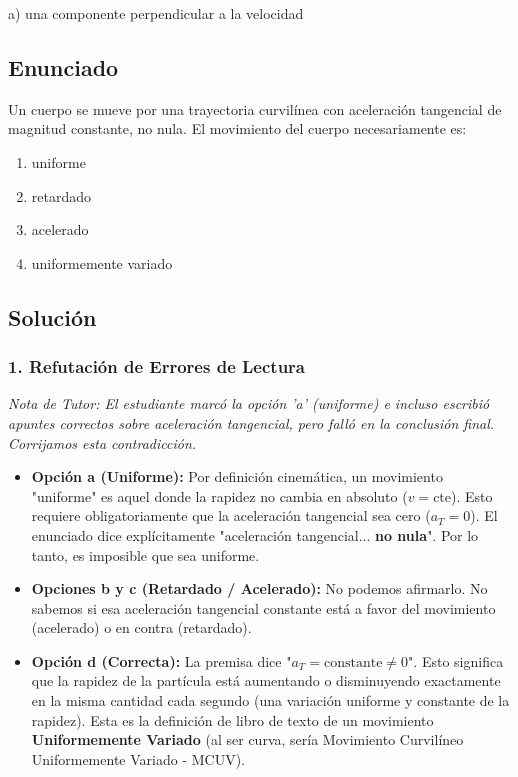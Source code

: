 \documentclass[12pt, a4paper]{article}
\begin{document}
\begin{tcolorbox}[colback=green!5!white, colframe=green!50!black, title=Respuesta Final]
\centering \Large a) una componente perpendicular a la velocidad
\end{tcolorbox}

\newpage

\subsection*{Enunciado}
Un cuerpo se mueve por una trayectoria curvilínea con aceleración tangencial de magnitud constante, no nula. El movimiento del cuerpo necesariamente es:
\begin{enumerate}[label=\alph*)]
    \item uniforme
    \item retardado
    \item acelerado
    \item uniformemente variado
\end{enumerate}

\subsection*{Solución}

\subsubsection*{1. Refutación de Errores de Lectura}
\textit{Nota de Tutor: El estudiante marcó la opción 'a' (uniforme) e incluso escribió apuntes correctos sobre aceleración tangencial, pero falló en la conclusión final. Corrijamos esta contradicción.}

\begin{itemize}
    \item \textbf{Opción a (Uniforme):} Por definición cinemática, un movimiento "uniforme" es aquel donde la rapidez no cambia en absoluto ($v = \text{cte}$). Esto requiere obligatoriamente que la aceleración tangencial sea cero ($a_T = 0$). El enunciado dice explícitamente "aceleración tangencial... \textbf{no nula}". Por lo tanto, es imposible que sea uniforme.
    \item \textbf{Opciones b y c (Retardado / Acelerado):} No podemos afirmarlo. No sabemos si esa aceleración tangencial constante está a favor del movimiento (acelerado) o en contra (retardado).
    \item \textbf{Opción d (Correcta):} La premisa dice "$a_T = \text{constante} \neq 0$". Esto significa que la rapidez de la partícula está aumentando o disminuyendo exactamente en la misma cantidad cada segundo (una variación uniforme y constante de la rapidez). Esta es la definición de libro de texto de un movimiento \textbf{Uniformemente Variado} (al ser curva, sería Movimiento Curvilíneo Uniformemente Variado - MCUV).
\end{itemize}
\end{document}
